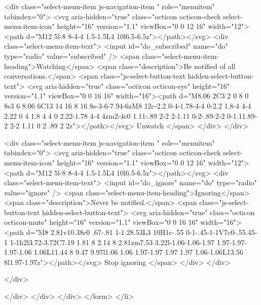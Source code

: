                 <div class="select-menu-item js-navigation-item " role="menuitem" tabindex="0">
                  <svg aria-hidden="true" class="octicon octicon-check select-menu-item-icon" height="16" version="1.1" viewBox="0 0 12 16" width="12"><path d="M12 5l-8 8-4-4 1.5-1.5L4 10l6.5-6.5z"></path></svg>
                  <div class="select-menu-item-text">
                    <input id="do_subscribed" name="do" type="radio" value="subscribed" />
                    <span class="select-menu-item-heading">Watching</span>
                    <span class="description">Be notified of all conversations.</span>
                    <span class="js-select-button-text hidden-select-button-text">
                      <svg aria-hidden="true" class="octicon octicon-eye" height="16" version="1.1" viewBox="0 0 16 16" width="16"><path d="M8.06 2C3 2 0 8 0 8s3 6 8.06 6C13 14 16 8 16 8s-3-6-7.94-6zM8 12c-2.2 0-4-1.78-4-4 0-2.2 1.8-4 4-4 2.22 0 4 1.8 4 4 0 2.22-1.78 4-4 4zm2-4c0 1.11-.89 2-2 2-1.11 0-2-.89-2-2 0-1.11.89-2 2-2 1.11 0 2 .89 2 2z"></path></svg>
                      Unwatch
                    </span>
                  </div>
                </div>

                <div class="select-menu-item js-navigation-item " role="menuitem" tabindex="0">
                  <svg aria-hidden="true" class="octicon octicon-check select-menu-item-icon" height="16" version="1.1" viewBox="0 0 12 16" width="12"><path d="M12 5l-8 8-4-4 1.5-1.5L4 10l6.5-6.5z"></path></svg>
                  <div class="select-menu-item-text">
                    <input id="do_ignore" name="do" type="radio" value="ignore" />
                    <span class="select-menu-item-heading">Ignoring</span>
                    <span class="description">Never be notified.</span>
                    <span class="js-select-button-text hidden-select-button-text">
                      <svg aria-hidden="true" class="octicon octicon-mute" height="16" version="1.1" viewBox="0 0 16 16" width="16"><path d="M8 2.81v10.38c0 .67-.81 1-1.28.53L3 10H1c-.55 0-1-.45-1-1V7c0-.55.45-1 1-1h2l3.72-3.72C7.19 1.81 8 2.14 8 2.81zm7.53 3.22l-1.06-1.06-1.97 1.97-1.97-1.97-1.06 1.06L11.44 8 9.47 9.97l1.06 1.06 1.97-1.97 1.97 1.97 1.06-1.06L13.56 8l1.97-1.97z"></path></svg>
                      Stop ignoring
                    </span>
                  </div>
                </div>

              </div>

            </div>
          </div>
        </div>
</form>
  </li>

